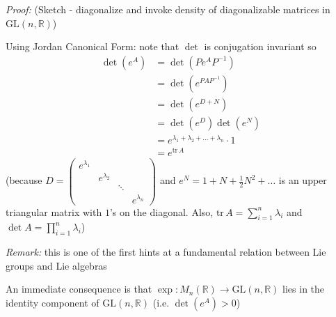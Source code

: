 \documentclass[12pt]{article}
\newcommand{\R}{\mathbb{R}}
\newcommand{\C}{\mathbb{C}}
\newcommand{\GL}{\text{GL}}
\newcommand{\tr}{\text{tr}\,}
\newenvironment*{tbox}[2][gray]{
    \begin{tcolorbox}[
        parbox=false,
        colback=#1!5!white,
        colframe=#1!75!black,
        breakable,
        title={#2}
    ]}
    {\end{tcolorbox}}
\begin{document}
    \begin{tbox}{\textbf{Theorem:} $\det(e^A) = e^{\tr A}$ for any matrix $A \in M_n(\C)$}
        \emph{Proof:} (Sketch - diagonalize and invoke density of diagonalizable matrices in $\GL(n, \R)$)

        Using Jordan Canonical Form: note that $\det$ is conjugation invariant so 
        \begin{align*}
            \det(e^A) &= \det(Pe^{A}P^{-1})\\ 
                &= \det(e^{PAP^{-1}})\\ 
                &= \det(e^{D + N})\\ 
                &= \det(e^D)\det(e^N)\\ 
                &= e^{\lambda_1 + \lambda_2 + \dots + \lambda_n} \cdot 1\\
                &= e^{\tr A}
        \end{align*}
        (because $D = \begin{pmatrix}
            e^{\lambda_1}\\ 
            & e^{\lambda_2}\\
            & & \ddots\\
            & & & e^{\lambda_n}
        \end{pmatrix}$ and $e^N = 1 + N + \frac{1}{2}N^2 + \dots$ is an upper triangular matrix with $1$'s on the diagonal. Also, $\tr A = \sum_{i=1}^n \lambda_i$ and $\det A = \prod_{i=1}^n \lambda_i$)
    \end{tbox}

    \emph{Remark:} this is one of the first hints at a fundamental relation between Lie groups and Lie algebras 

    An immediate consequence is that $\exp: M_n(\R) \to \GL(n, \R)$ lies in the identity component of $\GL(n, \R)$ (i.e. $\det(e^A) > 0$)

   
\end{document}

